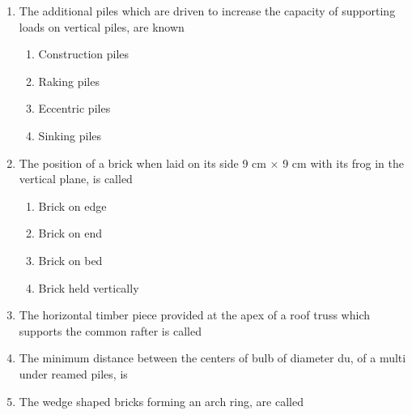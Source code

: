 \documentclass[11pt,a4paper]{article}
\begin{document}
\begin{enumerate}
\item{The additional piles which are driven to increase the capacity of supporting loads on vertical piles, are known}
\begin{enumerate}[label=\Alph*.]
\item{Construction piles}
\item{Raking piles}
\item{Eccentric piles}
\item{Sinking piles}
\end{enumerate}
\item{The position of a brick when laid on its side 9 cm $\times$ 9 cm with its frog in the vertical plane, is called
}
\begin{enumerate}[label=\Alph*.]
\item{Brick on edge}
\item{Brick on end}
\item{Brick on bed}
\item{Brick held vertically}
\end{enumerate}
\item{The horizontal timber piece provided at the apex of a roof truss which supports the common rafter is called}
\\
\item{The minimum distance between the centers of bulb of diameter du, of a multi under reamed piles, is}
\\
\item{The wedge shaped bricks forming an arch ring, are called}
\\
\end{enumerate}
\end{document}
